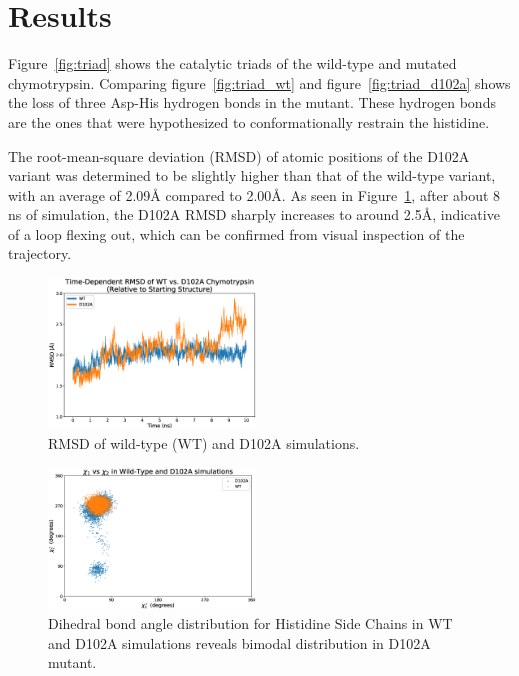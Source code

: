 \documentclass[11pt, twocolumn]{article}
\begin{document}
\section{Results}

Figure~\ref{fig:triad} shows the catalytic triads of the wild-type and mutated
chymotrypsin. Comparing figure~\ref{fig:triad_wt} and
figure~\ref{fig:triad_d102a} shows the loss of three Asp-His hydrogen bonds
in the mutant. These hydrogen bonds are the ones that were hypothesized to
conformationally restrain the histidine.

The root-mean-square deviation (RMSD) of atomic positions of the D102A variant
was determined to be slightly higher than
that of the wild-type variant, with an average of 2.09\AA{} compared to
2.00\AA{}. As seen in Figure~\ref{fig:rmsd}, after about 8 ns of simulation,
the D102A RMSD sharply increases to around 2.5\AA{}, indicative of a loop
flexing out, which can be confirmed from visual inspection of the trajectory.

\begin{figure}[H]
    \centering
        \includegraphics[width=0.49\textwidth]{rmsds.eps}
    \caption{RMSD of wild-type (WT) and D102A simulations.}\label{fig:rmsd}
\end{figure}

\vspace{-20pt}

\begin{figure}[H]
    \centering
        \includegraphics[width=0.49\textwidth]{chi_plot_wt_d102a.eps}
    \caption{Dihedral bond angle distribution for Histidine Side Chains
        in WT and D102A simulations reveals bimodal distribution
        in D102A mutant.}\label{fig:chiplot}
\end{figure}
\end{document}
